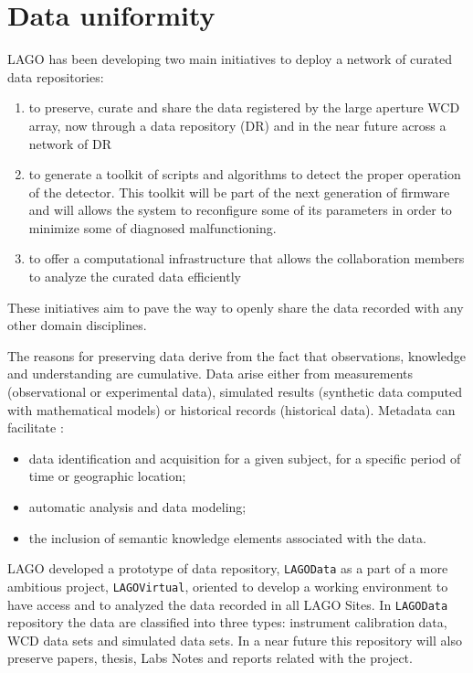 \section{Data uniformity} \label{sec:data}

LAGO has been developing two main initiatives to deploy a network of curated data repositories:

\begin{enumerate}
  \item to preserve, curate and share the data registered by the large aperture
WCD array, now through a data repository (DR) and in the near future across a
network of DR

 \item to generate a toolkit of scripts and algorithms to detect
the proper operation of the detector. This toolkit will be part of the next
generation of firmware and will allows the system to reconfigure some of its
parameters in order to minimize some of diagnosed malfunctioning.  

 \item to offer a computational infrastructure that allows the collaboration
members to analyze the curated data efficiently

\end{enumerate} 

These initiatives aim to pave the way to openly share the data
recorded with any other domain disciplines.

The reasons for preserving data derive from the fact that observations,
knowledge and understanding are cumulative. Data arise either from measurements
(observational or experimental data), simulated results (synthetic data
computed with mathematical models) or historical records (historical data).
Metadata can facilitate \cite{MichenerEtal1997}:

\begin{itemize}
  \item data identification and acquisition for a given
      subject, for a specific period of time or geographic
      location;
  \item automatic analysis and data modeling;
  \item the inclusion of semantic knowledge elements
      associated with the data.
\end{itemize}


LAGO developed a prototype of  data repository, \texttt{LAGOData}
\cite{TorresEtAl2011} as a part of a more ambitious project,
\texttt{LAGOVirtual}\cite{CamachoEtal2009}, oriented to develop a working
environment to have access and to analyzed the data recorded in all LAGO Sites.
In \texttt{LAGOData}  repository the data are classified  into three types:
instrument calibration data, WCD data sets and simulated data sets. In a near
future this repository will also preserve papers, thesis, Labs Notes and
reports related with the project.

